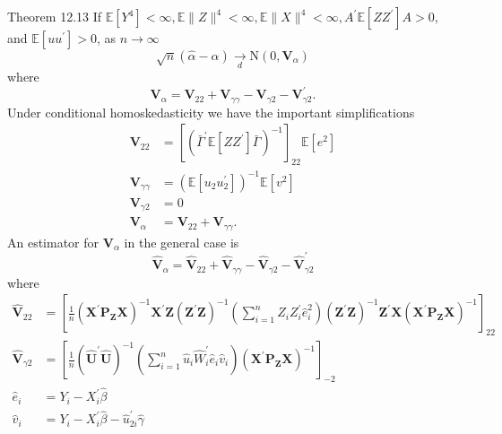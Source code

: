 \documentclass[10pt]{article}
\begin{document}
Theorem 12.13 If $\mathbb{E}\left[Y^{4}\right]<\infty, \mathbb{E}\|Z\|^{4}<\infty, \mathbb{E}\|X\|^{4}<\infty, A^{\prime} \mathbb{E}\left[Z Z^{\prime}\right] A>0$, and $\mathbb{E}\left[u u^{\prime}\right]>0$, as $n \rightarrow \infty$
$$
\sqrt{n}(\widehat{\alpha}-\alpha) \underset{d}{\longrightarrow} \mathrm{N}\left(0, \boldsymbol{V}_{\alpha}\right)
$$
where
$$
\boldsymbol{V}_{\alpha}=\boldsymbol{V}_{22}+\boldsymbol{V}_{\gamma \gamma}-\boldsymbol{V}_{\gamma 2}-\boldsymbol{V}_{\gamma 2}^{\prime} .
$$
Under conditional homoskedasticity we have the important simplifications
$$
\begin{aligned}
\boldsymbol{V}_{22} &=\left[\left(\bar{\Gamma}^{\prime} \mathbb{E}\left[Z Z^{\prime}\right] \bar{\Gamma}\right)^{-1}\right]_{22} \mathbb{E}\left[e^{2}\right] \\
\boldsymbol{V}_{\gamma \gamma} &=\left(\mathbb{E}\left[u_{2} u_{2}^{\prime}\right]\right)^{-1} \mathbb{E}\left[v^{2}\right] \\
\boldsymbol{V}_{\gamma 2} &=0 \\
\boldsymbol{V}_{\alpha} &=\boldsymbol{V}_{22}+\boldsymbol{V}_{\gamma \gamma} .
\end{aligned}
$$
An estimator for $\boldsymbol{V}_{\alpha}$ in the general case is
$$
\widehat{\boldsymbol{V}}_{\alpha}=\widehat{\boldsymbol{V}}_{22}+\widehat{\boldsymbol{V}}_{\gamma \gamma}-\widehat{\boldsymbol{V}}_{\gamma 2}-\widehat{\boldsymbol{V}}_{\gamma 2}^{\prime}
$$
where
$$
\begin{aligned}
\widehat{\boldsymbol{V}}_{22} &=\left[\frac{1}{n}\left(\boldsymbol{X}^{\prime} \boldsymbol{P}_{\boldsymbol{Z}} \boldsymbol{X}\right)^{-1} \boldsymbol{X}^{\prime} \boldsymbol{Z}\left(\boldsymbol{Z}^{\prime} \boldsymbol{Z}\right)^{-1}\left(\sum_{i=1}^{n} Z_{i} Z_{i}^{\prime} \widehat{e}_{i}^{2}\right)\left(\boldsymbol{Z}^{\prime} \boldsymbol{Z}\right)^{-1} \boldsymbol{Z}^{\prime} \boldsymbol{X}\left(\boldsymbol{X}^{\prime} \boldsymbol{P}_{\boldsymbol{Z}} \boldsymbol{X}\right)^{-1}\right]_{22} \\
\widehat{\boldsymbol{V}}_{\gamma 2} &=\left[\frac{1}{n}\left(\widehat{\boldsymbol{U}}^{\prime} \widehat{\boldsymbol{U}}\right)^{-1}\left(\sum_{i=1}^{n} \widehat{u}_{i} \widehat{W}_{i}^{\prime} \widehat{e}_{i} \widehat{v}_{i}\right)\left(\boldsymbol{X}^{\prime} \boldsymbol{P}_{\boldsymbol{Z}} \boldsymbol{X}\right)^{-1}\right]_{-2} \\
\widehat{e}_{i} &=Y_{i}-X_{i}^{\prime} \widehat{\beta} \\
\widehat{v}_{i} &=Y_{i}-X_{i}^{\prime} \widehat{\beta}-\widehat{u}_{2 i}^{\prime} \widehat{\gamma}
\end{aligned}
$$
\end{document}

